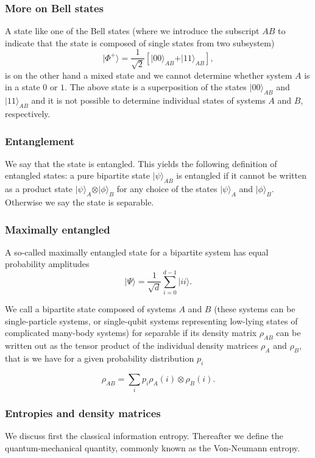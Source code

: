 \documentclass{beamer}
\begin{document}
\begin{frame}
\frametitle{More on Bell states}

A state like one of the Bell states (where we introduce the subscript $AB$ to indicate that the state is composed of single states from two subsystem)
\[
\vert \Phi^+\rangle = \frac{1}{\sqrt{2}}\left[\vert 00\rangle_{AB} +\vert 11\rangle_{AB}\right],
\]
is on the other hand a mixed state and we cannot determine whether system $A$ is in a state $0$ or $1$. The above state is a superposition of the states $\vert 00\rangle_{AB}$ and $\vert 11\rangle_{AB}$ and it is not possible to determine individual states of systems $A$ and $B$, respectively.
\end{frame}

\begin{frame}
\frametitle{Entanglement}

We say that the state is entangled. This yields the following
definition of entangled states: a pure bipartite state $\vert
\psi\rangle_{AB}$ is entangled if it cannot be written as a product
state $\vert\psi\rangle_{A}\otimes\vert\phi\rangle_B$ for any choice
of the states $\vert\psi\rangle_{A}$ and $\vert\phi\rangle_B$. Otherwise we say the state is separable.
\end{frame}

\begin{frame}
\frametitle{Maximally entangled}

A so-called maximally entangled state for a bipartite system has equal  probability amplitudes
\[
\vert \Psi \rangle = \frac{1}{\sqrt{d}}\sum_{i=0}^{d-1}\vert ii\rangle.
\]

We call a bipartite state composed of systems $A$ and $B$ (these
systems can be single-particle systems, or single-qubit systems
representing low-lying states of complicated many-body systems) for
separable if its density matrix $\rho_{AB}$ can be written out as the
tensor product of the individual density matrices $\rho_A$ and
$\rho_B$, that is we have for a given probability distribution $p_i$

\[
\rho_{AB}=\sum_ip_i\rho_A(i)\otimes \rho_B(i).
\]
\end{frame}

\begin{frame}
\frametitle{Entropies and density matrices}

We discuss first the classical information entropy.
Thereafter we define the quantum-mechanical quantity, commonly known as the Von-Neumann entropy.
\end{frame}
\end{document}
